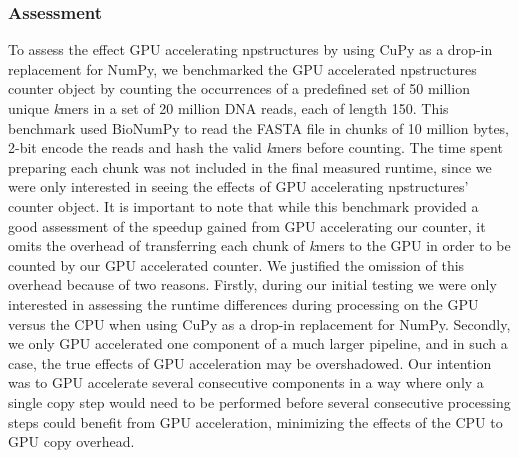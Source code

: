 \subsubsection{Assessment} \label{methods:preliminary_testing:assessment}
To assess the effect GPU accelerating npstructures by using CuPy as a drop-in replacement for NumPy, we benchmarked the GPU accelerated npstructures counter object by counting the occurrences of a predefined set of 50 million unique \textit{k}mers in a set of 20 million DNA reads, each of length 150.
This benchmark used BioNumPy to read the FASTA file in chunks of 10 million bytes, 2-bit encode the reads and hash the valid \textit{k}mers before counting.
The time spent preparing each chunk was not included in the final measured runtime, since we were only interested in seeing the effects of GPU accelerating npstructures' counter object.
It is important to note that while this benchmark provided a good assessment of the speedup gained from GPU accelerating our counter, it omits the overhead of transferring each chunk of \textit{k}mers to the GPU in order to be counted by our GPU accelerated counter.
We justified the omission of this overhead because of two reasons.
Firstly, during our initial testing we were only interested in assessing the runtime differences during processing on the GPU versus the CPU when using CuPy as a drop-in replacement for NumPy.
Secondly, we only GPU accelerated one component of a much larger pipeline, and in such a case, the true effects of GPU acceleration may be overshadowed.
Our intention was to GPU accelerate several consecutive components in a way where only a single copy step would need to be performed before several consecutive processing steps could benefit from GPU acceleration, minimizing the effects of the CPU to GPU copy overhead.


